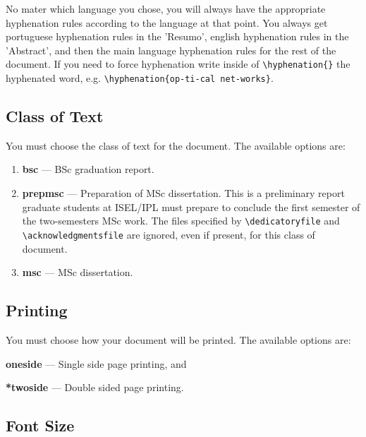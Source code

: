 No mater which language you chose, you will always have the appropriate hyphenation rules according to the language at that point. You always get portuguese hyphenation rules in the 'Resumo', english hyphenation rules in the 'Abstract', and then the main language hyphenation rules for the rest of the document. If you need to force hyphenation write inside of \verb!\hyphenation{}! the hyphenated word, e.g. \verb!\hyphenation{op-ti-cal net-works}!.

\subsection{Class of Text} %
\label{sub:class_of_text}

You must choose the class of text for the document. The available options are:

\begin{enumerate}
	\item \textbf{bsc} --- BSc graduation report.
	\item \textbf{prepmsc} --- Preparation of MSc dissertation. This is a preliminary report graduate students at ISEL/IPL must prepare to conclude the first semester of the two-semesters MSc work. The files specified by \verb!\dedicatoryfile! and \verb!\acknowledgmentsfile! are ignored, even if present, for this class of document.
	\item \textbf{msc} --- MSc dissertation.
\end{enumerate}
%
\subsection{Printing} %
\label{sub:printing}

You must choose how your document will be printed. The available options are:

\begin{inparaenum}[(i)]
\item \textbf{oneside} --- Single side page printing, and
\item \textbf{*twoside} --- Double sided page printing.
\end{inparaenum}


\subsection{Font Size} %
\label{ssec:font_size}

